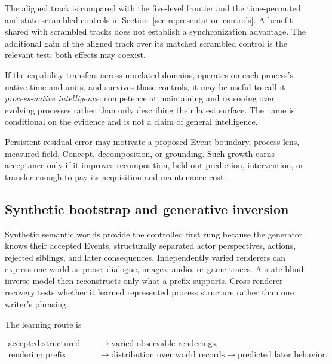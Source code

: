 \documentclass[10pt]{article}
\begin{document}
The aligned track is compared with the five-level frontier and the
time-permuted and state-scrambled controls in Section~\ref{sec:representation-controls}.
A benefit shared with scrambled tracks does not establish a synchronization
advantage. The additional gain of the aligned track over its matched scrambled
control is the relevant test; both effects may coexist.

If the capability transfers across unrelated domains, operates on each
process's native time and units, and survives those controls, it may be useful
to call it \emph{process-native intelligence}: competence at maintaining and
reasoning over evolving processes rather than only describing their latest
surface. The name is conditional on the evidence and is not a claim of general
intelligence.

Persistent residual error may motivate a proposed Event boundary, process
lens, measured field, Concept, decomposition, or grounding. Such growth earns acceptance only if it
improves recomposition, held-out prediction, intervention, or transfer enough
to pay its acquisition and maintenance cost.

\subsection{Synthetic bootstrap and generative inversion}
\label{sec:generative-inversion}

Synthetic semantic worlds provide the controlled first rung because the
generator knows their accepted Events, structurally separated actor
perspectives, actions, rejected siblings,
and later consequences. Independently varied renderers can express one world
as prose, dialogue, images, audio, or game traces. A state-blind inverse model
then reconstructs only what a prefix supports. Cross-renderer recovery tests
whether it learned represented process structure rather than one writer's
phrasing.

The learning route is

\begin{equation}
 \begin{aligned}
  \text{accepted structured world}
  &\rightarrow\text{varied observable renderings},\\
  \text{rendering prefix}
  &\rightarrow\text{distribution over world records}
  \rightarrow\text{predicted later behavior}.
 \end{aligned}
 \label{eq:generative-inversion-method}
\end{equation}
\end{document}
